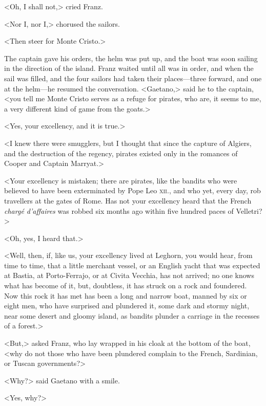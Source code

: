  <Oh, I shall not,> cried Franz. 

 <Nor I, nor I,> chorused the sailors. 

 <Then steer for Monte Cristo.> 

 The captain gave his orders, the helm was put up, and the boat was soon sailing in the direction of the island. Franz waited until all was in order, and when the sail was filled, and the four sailors had taken their places—three forward, and one at the helm—he resumed the conversation. <Gaetano,> said he to the captain, <you tell me Monte Cristo serves as a refuge for pirates, who are, it seems to me, a very different kind of game from the goats.> 

 <Yes, your excellency, and it is true.> 

 <I knew there were smugglers, but I thought that since the capture of Algiers, and the destruction of the regency, pirates existed only in the romances of Cooper and Captain Marryat.> 

 <Your excellency is mistaken; there are pirates, like the bandits who were believed to have been exterminated by Pope Leo \textsc{xii.}, and who yet, every day, rob travellers at the gates of Rome. Has not your excellency heard that the French \textit{chargé d'affaires} was robbed six months ago within five hundred paces of Velletri?> 

 <Oh, yes, I heard that.> 

 <Well, then, if, like us, your excellency lived at Leghorn, you would hear, from time to time, that a little merchant vessel, or an English yacht that was expected at Bastia, at Porto-Ferrajo, or at Civita Vecchia, has not arrived; no one knows what has become of it, but, doubtless, it has struck on a rock and foundered. Now this rock it has met has been a long and narrow boat, manned by six or eight men, who have surprised and plundered it, some dark and stormy night, near some desert and gloomy island, as bandits plunder a carriage in the recesses of a forest.> 

 <But,> asked Franz, who lay wrapped in his cloak at the bottom of the boat, <why do not those who have been plundered complain to the French, Sardinian, or Tuscan governments?> 

 <Why?> said Gaetano with a smile. 

 <Yes, why?> 

